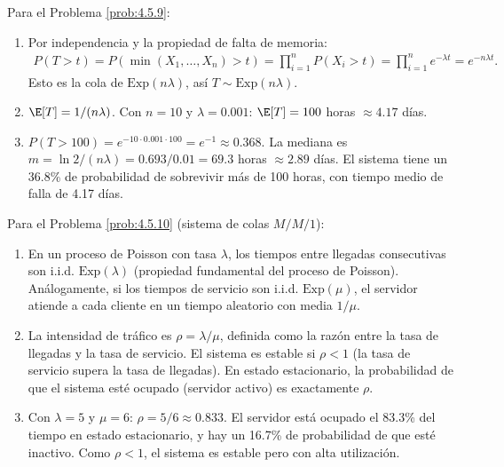 \begin{solucion}
	\label{sol:4.5.9}
	Para el Problema \ref{prob:4.5.9}:
	\begin{enumerate}
		\item Por independencia y la propiedad de falta de memoria:
		\begin{align*}
			P(T > t) = P(\min(X_1, \dots, X_n) > t) = \prod_{i=1}^{n} P(X_i > t) = \prod_{i=1}^{n} e^{-\lambda t} = e^{-n\lambda t}.
		\end{align*}
		Esto es la cola de $\text{Exp}(n\lambda)$, así $T \sim \text{Exp}(n\lambda)$.
		\item $\E[T] = 1/(n\lambda)$. Con $n = 10$ y $\lambda = 0.001$: $\E[T] = 100$ horas $\approx 4.17$ días.
		\item $P(T > 100) = e^{-10 \cdot 0.001 \cdot 100} = e^{-1} \approx 0.368$. La mediana es $m = \ln 2 / (n\lambda) = 0.693/0.01 = 69.3$ horas $\approx 2.89$ días. El sistema tiene un 36.8\% de probabilidad de sobrevivir más de 100 horas, con tiempo medio de falla de 4.17 días.
	\end{enumerate}
\end{solucion}

\begin{solucion}
	\label{sol:4.5.10}
	Para el Problema \ref{prob:4.5.10} (sistema de colas $M/M/1$):
	\begin{enumerate}
		\item En un proceso de Poisson con tasa $\lambda$, los tiempos entre llegadas consecutivas son i.i.d. $\text{Exp}(\lambda)$ (propiedad fundamental del proceso de Poisson). Análogamente, si los tiempos de servicio son i.i.d. $\text{Exp}(\mu)$, el servidor atiende a cada cliente en un tiempo aleatorio con media $1/\mu$.
		\item La intensidad de tráfico es $\rho = \lambda/\mu$, definida como la razón entre la tasa de llegadas y la tasa de servicio. El sistema es estable si $\rho < 1$ (la tasa de servicio supera la tasa de llegadas). En estado estacionario, la probabilidad de que el sistema esté ocupado (servidor activo) es exactamente $\rho$.
		\item Con $\lambda = 5$ y $\mu = 6$: $\rho = 5/6 \approx 0.833$. El servidor está ocupado el 83.3\% del tiempo en estado estacionario, y hay un 16.7\% de probabilidad de que esté inactivo. Como $\rho < 1$, el sistema es estable pero con alta utilización. \quad \qedhere
	\end{enumerate}
\end{solucion}

